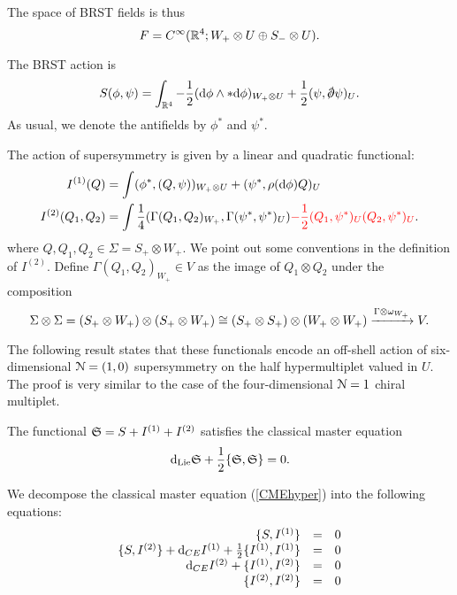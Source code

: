 \documentclass[10pt, oneside]{article}
\begin{document}
The space of BRST fields is thus
\[
F = C^\infty(\mathbb R^4 ; W_+ \otimes U \oplus S_- \otimes U) .
\]

The BRST action is
\[
S (\phi, \psi) = \int_{\RR^4} - \frac{1}{2}  (\d \phi \wedge * \d \phi)_{W_+ \otimes U} + \frac{1}{2} (\psi , \sd \dd \psi)_U .
\]
As usual, we denote the antifields by $\phi^*$ and $\psi^*$. 

The action of supersymmetry is given by a linear and quadratic functional:
\begin{align*}
I^{(1)} (Q) & = \int (\phi^*, (Q, \psi))_{W_+ \otimes U} + (\psi^*, \rho({\rm d} \phi) Q)_U \\
I^{(2)} (Q_1 , Q_2) & =  \int \frac{1}{4}(\Gamma(Q_1, Q_2)_{W_+} , \Gamma(\psi^*, \psi^*)_{U}) \textcolor{red}{-\frac{1}{2} (Q_1, \psi^*)_U(Q_2, \psi^*)_U  }.
\end{align*}
where $Q, Q_1,Q_2 \in \Sigma = S_+ \otimes W_+$. 
We point out some conventions in the definition of $I^{(2)}$. 
Define $\Gamma (Q_1,Q_2)_{W_+} \in V$ as the image of $Q_1 \otimes Q_2$ under the composition
\[
\Sigma \otimes \Sigma = (S_+ \otimes W_+) \otimes (S_+ \otimes W_+) \cong (S_+ \otimes S_+) \otimes (W_+ \otimes W_+) \xrightarrow{\Gamma \otimes \omega_{W_+}} V .
\]

The following result states that these functionals encode an off-shell action of six-dimensional $\mathcal N=(1,0)$ supersymmetry on the half hypermultiplet valued in $U$. 
The proof is very similar to the case of the four-dimensional $\mathcal N=1$ chiral multiplet. 

\begin{thm}
The functional $\mathfrak S = S + I^{(1)} + I^{(2)}$ satisfies the classical master equation
\begin{equation}\label{CMEhyper}
{\rm d}_{\rm Lie} \mathfrak S + \frac{1}{2} \{\mathfrak S, \mathfrak S\} = 0 .
\end{equation}
\end{thm}

We decompose the classical master equation (\ref{CMEhyper}) into the following equations:
\begin{equation}\label{CMEhyper2}
\begin{array}{rrrrrr}
\{S , I^{(1)}\} & = & 0 \\ 
\{S, I^{(2)}\} + {\rm d}_{CE} I^{(1)} + \frac{1}{2} \{I^{(1)}, I^{(1)}\} & = & 0 \\
{\rm d}_{CE} I^{(2)} + \{I^{(1)}, I^{(2)}\} & =& 0 \\
\{I^{(2)}, I^{(2)}\} & =& 0
\end{array}
\end{equation}
\end{document}
